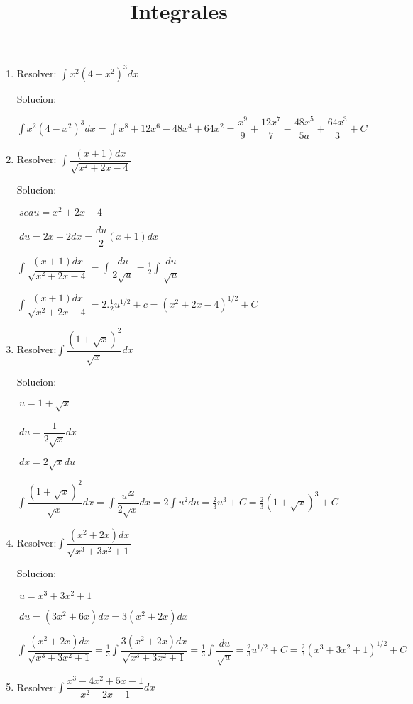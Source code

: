 \documentclass[10pt,a4paper]{book}
\title{Integrales}
\newcommand{\ds}{\displaystyle}
\begin{document}
\begin{enumerate} 
    \item Resolver: $\ds\int x^2(4-x^2)^3 dx$

        Solucion:

        $\ds\int x^2(4-x^2)^3 dx =\int x^8+12x^6-48x^4+64x^2=\dfrac{x^9}{9}+\dfrac{12x^7}{7}
        -\dfrac{48x^5}{5a}+\dfrac{64x^3}{3}+C$
    \vspace{0.5cm}
    \item Resolver: $\ds\int\dfrac{(x+1)dx}{\sqrt{x^2+2x-4} }$
     
        Solucion:

        $\ds\ sea u=x^2+2x-4$ 

        $\ds\ du=2x+2dx=\dfrac{du}{2}(x+1)dx$

        $\ds\int\dfrac{(x+1)dx}{\sqrt{x^2+2x-4}}=\int\dfrac{du}{2\sqrt{u}}=\frac{1}{2}\int\dfrac{du}{\sqrt{u}}$

        $\ds\int\dfrac{(x+1)dx}{\sqrt{x^2+2x-4} }=2.\frac{1}{2}u^{1/2}+c=(x^2+2x-4)^{1/2}+C$
    \vspace{0.5cm}
    \item Resolver:$\ds\int\dfrac{(1+\sqrt{x})^2 }{\sqrt{x} }dx$
    
        Solucion:

        $\ds\ u=1+\sqrt{x}$
        
        $\ds\ du=\dfrac{1}{2\sqrt{x}}dx $

        $\ds\ dx=2\sqrt{x}du$
        
        $\ds\int\dfrac{(1+\sqrt{x})^2}{\sqrt{x}}dx=\int\dfrac{u^22}{2\sqrt{x}}dx=2\int u^2du=\frac{2}{3}u^3+C=\frac{2}{3}(1+\sqrt{x})^3+C$

    \vspace{0.5cm}
    \item Resolver:$\ds\int\dfrac{(x^2+2x)dx}{\sqrt{x^3+3x^2+1} }$
    
        Solucion:

        $\ds\ u=x^3+3x^2+1$

        $\ds\ du=(3x^2+6x)dx=3(x^2+2x)dx$

        $\ds\int\dfrac{(x^2+2x)dx}{\sqrt{x^3+3x^2+1}}=\frac{1}{3}\int\dfrac{3(x^2+2x)dx}{\sqrt{x^3+3x^2+1}}=\frac{1}{3}\int\dfrac{du}{\sqrt{u}}=\frac{2}{3}u^{1/2}+C=
        \frac{2}{3}(x^3+3x^2+1)^{1/2}+C$
        
    \vspace{0.5cm}
    \item Resolver:$\ds\int\dfrac{x^3-4x^2+5x-1}{x^2-2x+1}dx$
    

\end{enumerate}
\end{document}
